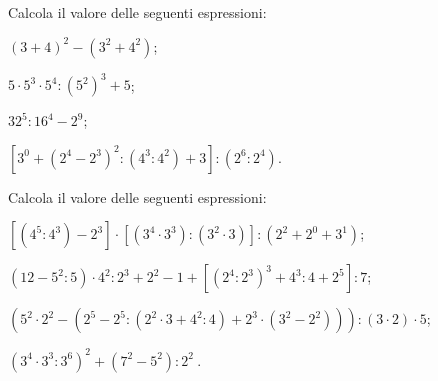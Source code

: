\begin{esercizio}[\Ast]
 Calcola il valore delle seguenti espressioni:
 \begin{enumeratea}
 \item $(3+4)^2-\left(3^2+4^2\right)$;
 \item $5\cdot5^3\cdot5^4:\left(5^2\right)^3+5$;
 \item $32^5:16^4-2^9$;
 \item $\left[3^0+\left(2^4-2^3\right)^2:\left(4^3:4^2\right)+3 \right]:\left(2^6:2^4\right)$.
 \end{enumeratea}
\end{esercizio}


\begin{esercizio}[\Ast]
 Calcola il valore delle seguenti espressioni:
 \begin{enumeratea}
 \item $\left[\left(4^5:4^3\right)-2^3\right]\cdot\left[\left(3^4\cdot 3^3\right):\left(3^2\cdot3\right)\right]:\left(2^2+2^0+3^1\right)$;
 \item $\left(12-5^2:5\right)\cdot4^2:2^3+2^2-1+\left[\left(2^4:2^3\right)^3+4^3:4+2^5\right]:7$;
 \item $\left(5^2\cdot2^2-\left(2^5-2^5:\left(2^2\cdot 3 +4^2:4\right)+2^3\cdot\left(3^2-2^2\right)\right)\right):\left(3\cdot2 \right)\cdot5$;
 \item $\left(3^4\cdot3^3:3^6\right)^2+\left(7^2-5^2\right):2^2~$.
 \end{enumeratea}
\end{esercizio}

